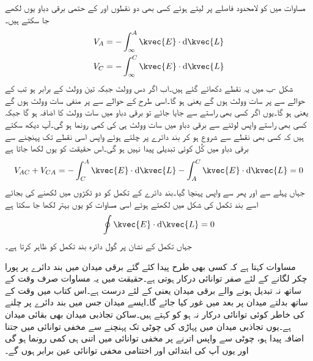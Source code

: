 مساوات  میں  کو لامحدود فاصلے پر لیتے ہوئے کسی بھی دو نقطوں  اور  کے حتمی برقی دباو یوں لکھے جا سکتے ہیں۔
\begin{align*}
V_A&=-\int_{\infty}^{A} \kvec{E} \cdot \dif \kvec{L}\\
V_C&=-\int_{\infty}^{C} \kvec{E} \cdot \dif \kvec{L}
\end{align*}
شکل -ب میں یہ نقطے دکھائے گئے ہیں۔اب اگر  دس وولٹ جبکہ  تین وولٹ کے برابر ہو تب  کے حوالے سے  پر سات وولٹ ہوں گے یعنی   ہو گا۔اسی طرح  کے حوالے سے  پر منفی سات وولٹ ہوں گے یعنی  ہو گا۔یوں اگر کسی بھی راستے   سے  جایا جائے تو برقی دباو میں سات وولٹ کا اضافہ ہو گا جبکہ کسی بھی راستے واپس  لوٹنے سے برقی دباو میں سات وولٹ ہی کی کمی رونما ہو گی۔آپ دیکھ سکتے ہیں کہ کسی بھی نقطے سے شروع ہو کر بند دائرے پر چلتے ہوئے واپس اسی نقطے تک پہنچنے سے برقی دباو میں کُل کوئی تبدیلی پیدا نہیں ہو گی۔اس حقیقت کو یوں لکھا جاتا ہے
\begin{align*}
V_{AC}+V_{CA}=-\int_{C}^{A} \kvec{E} \cdot \dif \kvec{L}-\int_{A}^{C} \kvec{E} \cdot \dif \kvec{L}=0
\end{align*}
جہاں پہلے  سے  اور پھر  سے واپس  پہنچا گیا۔بند دائرے کے تکمل کو دو ٹکڑوں میں لکھنے کی بجائے اسے بند تکمل کی شکل میں لکھتے ہوئے اسی مساوات کو یوں بہتر لکھا جا سکتا ہے 
\begin{align}\label{مساوات_توانائی_بند_راستا}
\oint \kvec{E} \cdot \dif \kvec{L}=0
\end{align}
جہاں تکمل کے نشان پر گول دائرہ بند تکمل کو ظاہر کرتا ہے۔

مساوات  کہتا ہے کہ کسی بھی طرح پیدا کئے گئے برقی میدان میں بند دائرے پر پورا چکر لگانے کے لئے صفر توانائی درکار ہوتی ہے۔حقیقت میں یہ مساوات صرف وقت کے ساتھ نہ تبدیل ہونے والے برقی میدان یعنی   کے لئے درست ہے۔اس کتاب میں وقت کے ساتھ بدلتے میدان پر بعد میں غور کیا جائے گا۔ایسے میدان جس میں بند دائرے پر چلنے کی خاطر کوئی توانائی درکار نہ ہو کو  کہتے ہیں۔ساکن تجاذبی میدان بھی بقائی میدان ہے۔یوں تجاذبی میدان میں پہاڑی کی چوٹی تک پہنچنے سے مخفی توانائی میں جتنا اضافہ پیدا ہو، چوٹی سے واپس اترنے پر مخفی توانائی میں اتنی ہی کمی رونما ہو گی اور یوں آپ کی ابتدائی اور اختتامی مخفی توانائی عین برابر ہوں گے۔


